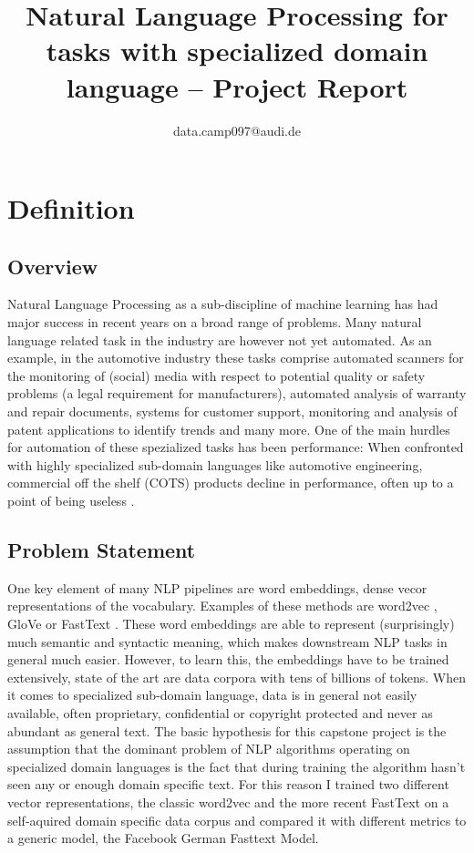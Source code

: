 \documentclass[10pt,a4paper]{article}
\begin{document}
	\title{Natural Language Processing for tasks with specialized domain language  --  Project Report}
	\author{data.camp097@audi.de}
	\maketitle
	\tableofcontents
	\section{Definition}
	
	
	\subsection{Overview}
	Natural Language Processing as a sub-discipline of machine learning has had major success in recent years on a broad range of problems. 
	Many natural language related task in the industry are however not yet automated. As an example, in the automotive industry these tasks comprise automated scanners for the monitoring of (social) media with respect to potential quality or safety problems (a legal requirement for manufacturers), automated analysis of warranty and repair documents, systems for customer support, monitoring and analysis of patent applications to identify trends and many more. One of the main hurdles for automation of these spezialized tasks has been performance: 
	When confronted with highly specialized sub-domain languages like automotive engineering, commercial off the shelf (COTS) products decline in performance, often up to a point of being useless \cite{OilandGas}. 
    

	\subsection{Problem Statement}
	
	One key element of many NLP pipelines are word embeddings, dense vecor representations of the vocabulary. Examples of these methods are word2vec \cite{word2vec}, GloVe \cite{pennington2014glove} or FastText \cite{bojanowski2017enriching}. These word embeddings are able to represent (surprisingly) much semantic and syntactic meaning, which makes downstream NLP tasks in general much easier. However, to learn this, the embeddings have to be trained extensively, state of the art are data corpora with tens of billions of tokens. When it comes to specialized sub-domain language, data is in general not easily available, often proprietary, confidential or copyright protected and never as abundant as general text. 
	The basic hypothesis for this capstone project is the assumption that the dominant problem of NLP algorithms operating on specialized domain languages is the fact that during training the algorithm hasn't seen any or enough domain specific text. For this reason I trained two different vector representations, the classic word2vec and the more recent FastText on a self-aquired domain specific data corpus and compared it with different metrics to a generic model, the Facebook German Fasttext Model.
		
\end{document}

